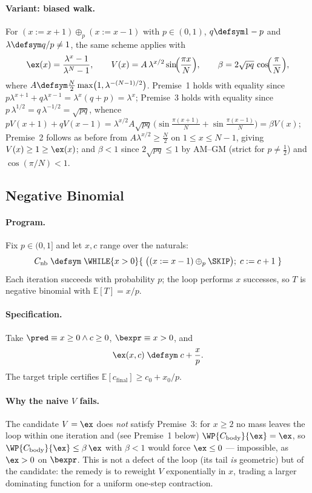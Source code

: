 \paragraph{Variant: biased walk.}
For $(x \mathrel{:=} x+1) \oplus_{p} (x \mathrel{:=} x-1)$ with
$p \in (0,1)$, $q \defsym 1-p$ and $\lambda \defsym q/p \neq 1$, the same
scheme applies with
\[
  \ex(x) = \frac{\lambda^x - 1}{\lambda^N - 1},
  \qquad
  V(x) = A\,\lambda^{x/2} \sin\!\Bigl(\frac{\pi x}{N}\Bigr),
  \qquad
  \beta = 2\sqrt{pq}\,\cos\!\Bigl(\frac{\pi}{N}\Bigr),
\]
where $A \defsym \tfrac{N}{2}\max\bigl(1, \lambda^{-(N-1)/2}\bigr)$.
Premise~1 holds with equality since
$p\lambda^{x+1} + q\lambda^{x-1} = \lambda^{x}(q + p) = \lambda^x$;
Premise~3 holds with equality since
$p\,\lambda^{1/2} = q\,\lambda^{-1/2} = \sqrt{pq}$, whence
$p V(x+1) + q V(x-1)
 = \lambda^{x/2}A\sqrt{pq}\,\bigl(\sin\tfrac{\pi(x+1)}{N}
 + \sin\tfrac{\pi(x-1)}{N}\bigr) = \beta V(x)$;
Premise~2 follows as before from
$A\lambda^{x/2} \geq \tfrac{N}{2}$ on $1 \leq x \leq N-1$, giving
$V(x) \geq 1 \geq \ex(x)$; and
$\beta \lt 1$ since $2\sqrt{pq} \leq 1$ by AM--GM (strict for
$p \neq \tfrac12$) and $\cos(\pi/N) \lt 1$.

\subsection{Negative Binomial}\label{app:bench-nb}

\paragraph{Program.}
Fix $p \in (0,1]$ and let $x, c$ range over the naturals:
\[
  C_{\text{nb}} \;\defsym\;
  \WHILE{x > 0}{\;
    \bigl((x \mathrel{:=} x-1) \oplus_{p} \SKIP\bigr);\;
    c \mathrel{:=} c+1
  \;}
\]
Each iteration succeeds with probability $p$; the loop performs $x$
successes, so $T$ is negative binomial with $\mathbb{E}[T] = x/p$.

\paragraph{Specification.}
Take $\pred \equiv x \geq 0 \land c \geq 0$, $\bexpr \equiv x > 0$, and
\[
  \ex(x,c) \;\defsym\; c + \frac{x}{p}.
\]
The target triple certifies
$\mathbb{E}[c_{\text{final}}] \geq c_0 + x_0/p$.

\paragraph{Why the naive $V$ fails.}
The candidate $V = \ex$ does \emph{not} satisfy Premise~3: for $x \geq 2$ no
mass leaves the loop within one iteration and (see Premise~1 below)
$\WP{C_{\text{body}}}{\ex} = \ex$, so $\WP{C_{\text{body}}}{\ex} \leq
\beta\,\ex$ with $\beta \lt 1$ would force $\ex \leq 0$ --- impossible, as
$\ex > 0$ on $\bexpr$. This is not a defect of the loop (its tail \emph{is}
geometric) but of the candidate: the remedy is to reweight $V$ exponentially
in $x$, trading a larger dominating function for a uniform one-step
contraction.

